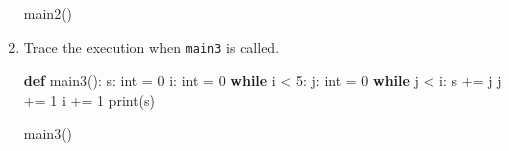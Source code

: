 \documentclass[]{article}
\newenvironment{Shaded}{}{}
\newcommand{\KeywordTok}[1]{\textcolor[rgb]{0.00,0.44,0.13}{\textbf{#1}}}
\newcommand{\DecValTok}[1]{\textcolor[rgb]{0.25,0.63,0.44}{#1}}
\newcommand{\ControlFlowTok}[1]{\textcolor[rgb]{0.00,0.44,0.13}{\textbf{#1}}}
\newcommand{\OperatorTok}[1]{\textcolor[rgb]{0.40,0.40,0.40}{#1}}
\newcommand{\BuiltInTok}[1]{#1}
\newcommand{\NormalTok}[1]{#1}
\begin{document}
\begin{enumerate}
\begin{Shaded}
\begin{Highlighting}[]
\NormalTok{main2()}
\end{Highlighting}
\end{Shaded}
\item
  Trace the execution when \texttt{main3} is called.

\begin{Shaded}
\begin{Highlighting}[]
\KeywordTok{def}\NormalTok{ main3():}
\NormalTok{    s: }\BuiltInTok{int} \OperatorTok{=} \DecValTok{0}
\NormalTok{    i: }\BuiltInTok{int} \OperatorTok{=} \DecValTok{0}
    \ControlFlowTok{while}\NormalTok{ i }\OperatorTok{<} \DecValTok{5}\NormalTok{:}
\NormalTok{        j: }\BuiltInTok{int} \OperatorTok{=} \DecValTok{0}
        \ControlFlowTok{while}\NormalTok{ j }\OperatorTok{<}\NormalTok{ i:}
\NormalTok{            s }\OperatorTok{+=}\NormalTok{ j}
\NormalTok{            j }\OperatorTok{+=} \DecValTok{1}
\NormalTok{        i }\OperatorTok{+=} \DecValTok{1}
    \BuiltInTok{print}\NormalTok{(s)}

\NormalTok{main3()}
\end{Highlighting}
\end{Shaded}
\end{enumerate}
\end{document}

